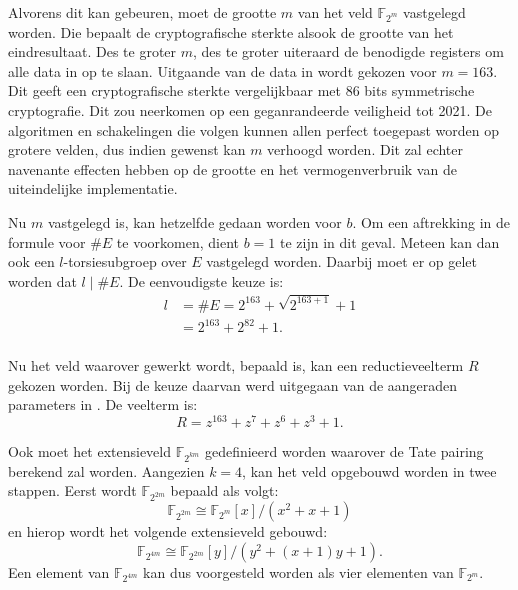 Alvorens dit kan gebeuren, moet de grootte $m$ van het veld $\mathbb{F}_{2^m}$ vastgelegd worden. Die bepaalt de cryptografische sterkte alsook de grootte van het eindresultaat. Des te groter $m$, des te groter uiteraard de benodigde registers om alle data in op te slaan. Uitgaande van de data in \cite{lenstra} wordt gekozen voor $m = 163$. Dit geeft een cryptografische sterkte vergelijkbaar met 86 bits symmetrische cryptografie. Dit zou neerkomen op een geganrandeerde veiligheid tot 2021. De algoritmen en schakelingen die volgen kunnen allen perfect toegepast worden op grotere velden, dus indien gewenst kan $m$ verhoogd worden. Dit zal echter navenante effecten hebben op de grootte en het vermogenverbruik van de uiteindelijke implementatie.

Nu $m$ vastgelegd is, kan hetzelfde gedaan worden voor $b$. Om een aftrekking in de formule voor $\#E$ te voorkomen, dient $b = 1$ te zijn in dit geval. Meteen kan dan ook een $l$-torsiesubgroep over $E$ vastgelegd worden. Daarbij moet er op gelet worden dat $l \mid \#E$. De eenvoudigste keuze is:
\[\begin{aligned}
l	&= \#E = 2^{163} + \sqrt{2^{163 + 1}} + 1\\
	&= 2^{163} + 2^{82} + 1.\\
\end{aligned}\]

Nu het veld waarover gewerkt wordt, bepaald is, kan een reductieveelterm $R$ gekozen worden. Bij de keuze daarvan werd uitgegaan van de aangeraden parameters in \cite{sec2}. De veelterm is:
\[R = z^{163} + z^7 + z^6 + z^3 + 1.\]

Ook moet het extensieveld $\mathbb{F}_{2^{k m}}$ gedefinieerd worden waarover de Tate pairing berekend zal worden. Aangezien $k = 4$, kan het veld opgebouwd worden in twee stappen. Eerst wordt $\mathbb{F}_{2^{2m}}$ bepaald als volgt:
\[\mathbb{F}_{2^{2m}} \cong \mathbb{F}_{2^m}[x]/(x^2 + x + 1)\]
en hierop wordt het volgende extensieveld gebouwd:
\[\mathbb{F}_{2^{4m}} \cong \mathbb{F}_{2^{2m}}[y]/(y^2 + (x + 1)y + 1).\]
Een element van $\mathbb{F}_{2^{4m}}$ kan dus voorgesteld worden als vier elementen van $\mathbb{F}_{2^m}$.

